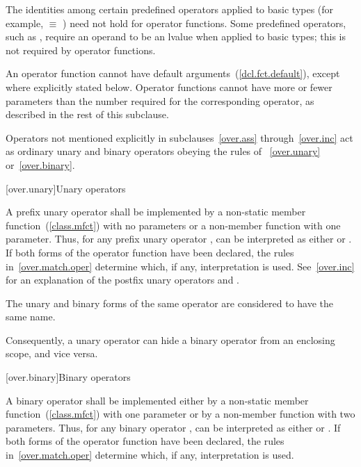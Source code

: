 \pnum
{}%
The identities among certain predefined operators applied to basic types
(for example,
 $\equiv$
)
need not hold for operator functions.
Some predefined operators, such as
\tcode{+=},
require an operand to be an lvalue when applied to basic types;
this is not required by operator functions.

\pnum
{}%
An operator function cannot have default arguments~(\ref{dcl.fct.default}),
except where explicitly stated below.
Operator
functions cannot have more or fewer parameters than the
number required for the corresponding operator, as
described in the rest of this subclause.

\pnum
Operators not mentioned explicitly in subclauses~\ref{over.ass} through~\ref{over.inc}
act as ordinary unary and binary
operators obeying the rules of ~\ref{over.unary} or~\ref{over.binary}.%
%

[over.unary]{Unary operators}%
%

\pnum
A prefix unary operator shall be implemented by a
non-static member function~(\ref{class.mfct}) with no parameters or a
non-member function with one parameter.
%
Thus, for any prefix unary operator
,
can be interpreted as either
or
.
If both forms of the operator function have been declared,
the rules in~\ref{over.match.oper} determine which, if any, interpretation is
used.
See~\ref{over.inc} for an explanation of the postfix unary operators
\tcode{++}
and
\tcode{\dcr}.

\pnum
The unary and binary forms of the same operator are considered to have
the same name.
\begin{note}
Consequently, a unary operator can hide a binary
operator from an enclosing scope, and vice versa.
\end{note}

[over.binary]{Binary operators}%
%

\pnum
A binary operator shall be implemented either by a non-static member
function~(\ref{class.mfct})
with one parameter or by a non-member function with two parameters.
%
Thus, for any binary operator
,
can be interpreted as either
or
.
If both forms of the operator function have been declared,
the rules in~\ref{over.match.oper} determine which, if any, interpretation is
used.

